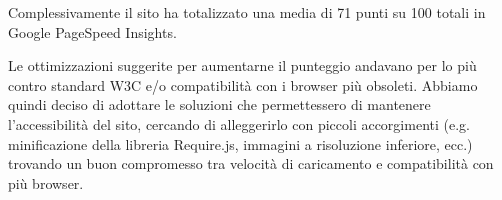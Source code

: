 Complessivamente il sito ha totalizzato una media di 71 punti su 100 totali in Google PageSpeed Insights.

Le ottimizzazioni suggerite per aumentarne il punteggio andavano per lo più
contro standard W3C e/o compatibilità con i browser più obsoleti. Abbiamo
quindi deciso di adottare le soluzioni che permettessero di mantenere
l'accessibilità del sito, cercando di alleggerirlo con piccoli accorgimenti
(e.g. minificazione della libreria Require.js, immagini a risoluzione
inferiore, ecc.) trovando un buon compromesso tra velocità di caricamento e
compatibilità con più browser.